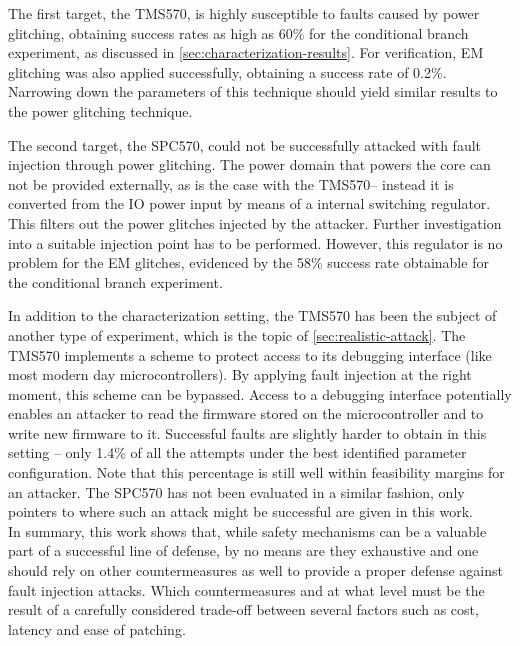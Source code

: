 \documentclass[10pt]{article}
\newcommand{\TI}{TMS570\xspace}
\newcommand{\ST}{SPC570\xspace}
\begin{document}
  The first target, the \TI, is highly susceptible to faults caused by power glitching, obtaining success rates as high as 60\% for the conditional branch experiment, as discussed in \autoref{sec:characterization-results}. For verification, EM glitching was also applied successfully, obtaining a success rate of 0.2\%. Narrowing down the parameters of this technique should yield similar results to the power glitching technique.

  The second target, the \ST, could not be successfully attacked with fault injection through power glitching. The power domain that powers the core can not be provided externally, as is the case with the \TI -- instead it is converted from the IO power input by means of a internal switching regulator. This filters out the power glitches injected by the attacker. Further investigation into a suitable injection point has to be performed. However, this regulator is no problem for the EM glitches, evidenced by the 58\% success rate obtainable for the conditional branch experiment.

  In addition to the characterization setting, the \TI has been the subject of another type of experiment, which is the topic of \autoref{sec:realistic-attack}. The \TI implements a scheme to protect access to its debugging interface (like most modern day microcontrollers). By applying fault injection at the right moment, this scheme can be bypassed. Access to a debugging interface potentially enables an attacker to read the firmware stored on the microcontroller and to write new firmware to it. Successful faults are slightly harder to obtain in this setting -- only 1.4\% of all the attempts under the best identified parameter configuration. Note that this percentage is still well within feasibility margins for an attacker. The \ST has not been evaluated in a similar fashion, only pointers to where such an attack might be successful are given in this work. \\

  \noindent In summary, this work shows that, while safety mechanisms can be a valuable part of a successful line of defense, by no means are they exhaustive and one should rely on other countermeasures as well to provide a proper defense against fault injection attacks. Which countermeasures and at what level must be the result of a carefully considered trade-off between several factors such as cost, latency and ease of patching. 


\newpage

\end{document}
